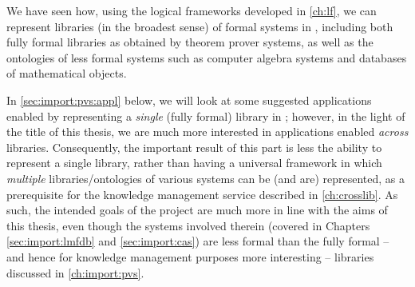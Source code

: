 We have seen how, using the logical frameworks developed in \autoref{ch:lf}, we can represent libraries (in the broadest sense) of formal systems in \ommt, including both fully formal libraries as obtained by theorem prover systems, as well as the ontologies of less formal systems such as computer algebra systems and databases of mathematical objects.\medskip

In \autoref{sec:import:pvs:appl} below, we will look at some suggested applications enabled by representing a \emph{single} (fully formal) library in \ommt; however, in the light of the title of this thesis, we are much more interested in applications enabled \emph{across} libraries.
Consequently, the important result of this part is less the ability to represent a single library, rather than having a universal framework in which \emph{multiple} libraries/ontologies of various systems can be (and are) represented, as a prerequisite for the knowledge management service described in \autoref{ch:crosslib}. As such, the intended goals of the \ODK project are much more in line with the aims of this thesis, even though the systems involved therein (covered in Chapters \ref{sec:import:lmfdb} and \ref{sec:import:cas}) are less formal than the fully formal -- and hence for knowledge management purposes more interesting -- libraries discussed in \autoref{ch:import:pvs}.